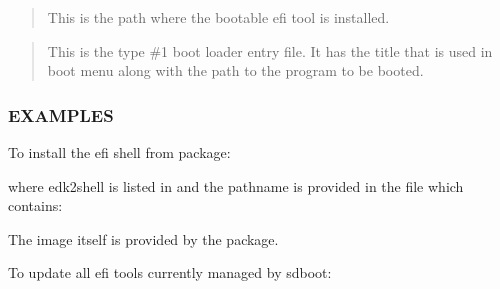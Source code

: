\documentclass[letterpaper,11pt,english]{sphinxmanual}
\begin{document}
\sphinxAtStartPar
{}
\begin{quote}

\sphinxAtStartPar
This is the path where the bootable efi tool is installed.
\end{quote}

\sphinxAtStartPar
{}
\begin{quote}

\sphinxAtStartPar
This is the type \#1 boot loader entry file. It has the title that is used in boot menu
along with the path to the program to be booted.
\end{quote}


\subsubsection{EXAMPLES}
\label{\detokenize{_build/man-ready/sd-boot-efi-tool-update.8:examples}}
\sphinxAtStartPar
To install the efi shell from  package:

\begin{sphinxVerbatim}[commandchars=\\\{\}]
\end{sphinxVerbatim}

\sphinxAtStartPar
where edk2\sphinxhyphen{}shell is listed in  and the pathname
is provided in the file  which contains:

\begin{sphinxVerbatim}[commandchars=\\\{\}]
\end{sphinxVerbatim}

\sphinxAtStartPar
The image itself is provided by the  package.

\sphinxAtStartPar
To update all efi tools currently managed by sd\sphinxhyphen{}boot:
\end{document}
